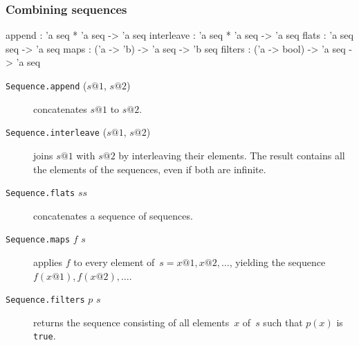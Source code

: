 \subsubsection{Combining sequences}
\begin{ttbox} 
append     : 'a seq * 'a seq -> 'a seq
interleave : 'a seq * 'a seq -> 'a seq
flats      : 'a seq seq -> 'a seq
maps       : ('a -> 'b) -> 'a seq -> 'b seq
filters    : ('a -> bool) -> 'a seq -> 'a seq
\end{ttbox} 
\begin{description}
\item[{\tt Sequence.append} ($s@1$, $s@2$)] 
concatenates $s@1$ to $s@2$.

\item[{\tt Sequence.interleave} ($s@1$, $s@2$)] 
joins $s@1$ with $s@2$ by interleaving their elements.  The result contains
all the elements of the sequences, even if both are infinite.

\item[{\tt Sequence.flats} $ss$] 
concatenates a sequence of sequences.

\item[{\tt Sequence.maps} $f$ $s$] 
applies $f$ to every element of~$s=x@1,x@2,\ldots$, yielding the sequence
$f(x@1),f(x@2),\ldots$.

\item[{\tt Sequence.filters} $p$ $s$] 
returns the sequence consisting of all elements~$x$ of~$s$ such that $p(x)$
is {\tt true}.
\end{description}

